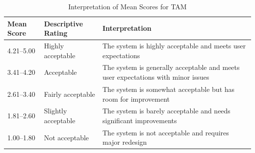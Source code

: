 %

\begin{table}[H]
	\centering
	\singlespacing
	\caption{Interpretation of Mean Scores for TAM}
	\label{inter:tam}
	\renewcommand{\arraystretch}{1.1}
	\begin{tabularx}{\linewidth}{p{}p{}X}
		\toprule 
		\textbf{Mean Score} & \textbf{Descriptive Rating} & \textbf{Interpretation} \\
		\midrule
		4.21–5.00 & Highly acceptable & The system is highly acceptable and meets user expectations\\
		3.41–4.20 & Acceptable & The system is generally acceptable and meets user expectations with minor issues \\
		2.61–3.40 & Fairly acceptable & The system is somewhat acceptable but has room for improvement \\
		1.81–2.60 & Slightly acceptable & The system is barely acceptable and needs significant improvements \\
		1.00–1.80 & Not acceptable & The system is not acceptable and requires major redesign \\
		\bottomrule
	\end{tabularx}
\end{table}

